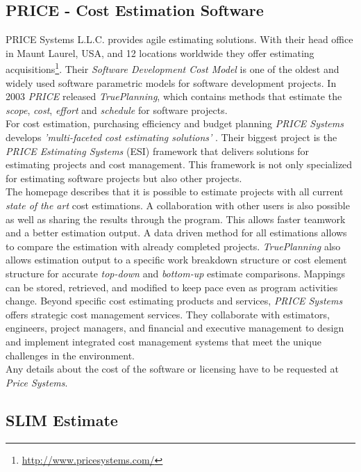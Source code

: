 \subsection{PRICE - Cost Estimation Software}

PRICE Systems L.L.C. provides agile estimating solutions. With their head office in Maunt Laurel, USA, and 12 locations worldwide they offer estimating acquisitions\footnote{\url{http://www.pricesystems.com/}}. Their \textit{Software Development Cost Model} is one of the oldest and widely used software parametric models for software development projects. In 2003 \textit{PRICE} released \textit{TruePlanning}, which contains methods that estimate the \textit{scope}, \textit{cost}, \textit{effort} and \textit{schedule} for software projects.
\\
For cost estimation, purchasing efficiency and budget planning \textit{PRICE Systems} develops \textit{'multi-faceted cost estimating solutions'} \cite{pricesystems}. Their biggest project is the \textit{PRICE Estimating Systems} (ESI) framework that delivers solutions for estimating projects and cost management. This framework is not only specialized for estimating software projects but also other projects.
\\
The homepage describes that it is possible to estimate projects with all current \textit{state of the art} cost estimations. A collaboration with other users is also possible as well as sharing the results through the program. This allows faster teamwork and a better estimation output. A data driven method for all estimations allows to compare the estimation with already completed projects. \textit{TruePlanning} also allows estimation output to a specific work breakdown structure or cost element structure for accurate \textit{top-down} and \textit{bottom-up} estimate comparisons. Mappings can be stored, retrieved, and modified to keep pace even as program activities change. Beyond specific cost estimating products and services, \textit{PRICE Systems} offers strategic cost management services. They collaborate with estimators, engineers, project managers, and financial and executive management to design and implement integrated cost management systems that meet the unique challenges in the environment.
\\
Any details about the cost of the software or licensing have to be requested at \textit{Price Systems}.

\subsection{SLIM Estimate}

